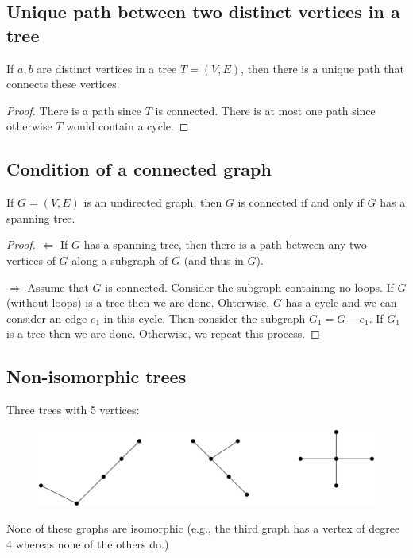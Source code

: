 \documentclass[11pt]{article}
\begin{document}
    \subsection{Unique path between two distinct vertices in a tree}

    If \(a,b\) are distinct vertices in a tree \(T = (V,E)\), then there is a unique path that connects these vertices.
    \begin{proof}
        There is a path since $T$ is connected. There is at most one path since otherwise $T$ would contain a cycle.
    \end{proof}

    \subsection{Condition of a connected graph}

    If \(G = (V,E)\) is an undirected graph, then $G$ is connected if and only if $G$ has a spanning tree.
    \begin{proof}
        \(\Leftarrow\) If $G$ has a spanning tree, then there is a path between any two vertices of $G$ along a subgraph of $G$ (and thus in $G$).

        \(\Rightarrow\) Assume that $G$ is connected. Consider the subgraph containing no loops. If $G$ (without loops) is a tree then we are done. Ohterwise, $G$ has a cycle and we can consider an edge \(e_1\) in this cycle. Then consider the subgraph \(G_1 = G - e_1\). If \(G_1\) is a tree then we are done. Otherwise, we repeat this process.
    \end{proof}

    \subsection{Non-isomorphic trees}

    Three trees with 5 vertices:
    \begin{figure}[H]
        \centering
        \includegraphics[scale=0.2]{noniso.png}
    \end{figure}

    None of these graphs are isomorphic (e.g., the third graph has a vertex of degree 4 whereas none of the others do.)
\end{document}

